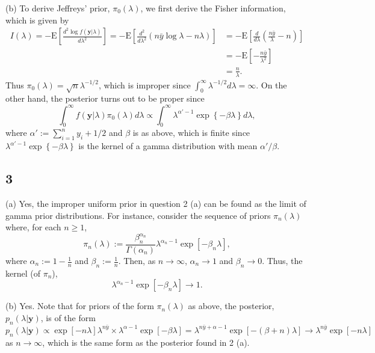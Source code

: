 \documentclass[12pt]{article}
\begin{document}
(b) To derive Jeffreys' prior, $\pi_0(\lambda)$, we first derive the Fisher information, which is given by 
\begin{align*}
  I(\lambda) = -\mathrm{E}\left[ \frac{d^{2}\log f(\bm{y}|\lambda)}{d\lambda^2} \right] = - \mathrm{E}\left[ \frac{d^2}{d\lambda^2}\left( 
  n\bar{y}\log\lambda - n\lambda \right) \right] 
  & = -\mathrm{E}\left[ \frac{d}{d\lambda}\left( \frac{n\bar{y}}{\lambda} - n \right) \right] \\
  & = -\mathrm{E}\left[ -\frac{n\bar{y}}{\lambda^2} \right] \\
  & = \frac{n}{\lambda}.
\end{align*}
Thus $\pi_0(\lambda) = \sqrt{n}\lambda^{-1/2}$, which is improper since $\int_{0}^{\infty}\lambda^{-1/2}d\lambda = \infty$.
On the other hand, the posterior turns out to be proper since 
\[
  \int_{0}^{\infty} f(\bm{y}|\lambda)\pi_0(\lambda)d\lambda \propto \int_{0}^{\infty} \lambda^{\alpha' - 1}\exp\left\{ -\beta \lambda
  \right\}d\lambda,
\]
where $\alpha' := \sum_{i=1}^{n}y_i + 1/2$ and $\beta$ is as above, which is finite since $\lambda^{\alpha' - 1}\exp\left\{ -\beta\lambda \right\}$ is
the kernel of a gamma distribution with mean $\alpha' / \beta$.

\subsection*{3} (a) Yes, the improper uniform prior in question 2 (a) can be found as the limit of gamma prior distributions. For instance, consider
the sequence of priors $\pi_n(\lambda)$ where, for each $n \geq 1$,
\[
  \pi_n(\lambda) := \frac{\beta_n^{\alpha_n}}{\Gamma(\alpha_n)} \lambda^{\alpha_n - 1}\exp\left[ -\beta_n \lambda \right],
\]
where $\alpha_n := 1 - \frac{1}{n}$ and $\beta_n := \frac{1}{n}$. Then, as $n \rightarrow \infty$, $\alpha_n \rightarrow 1$ and $\beta_n \rightarrow
0$. Thus, the kernel (of $\pi_n$),
\[ \lambda^{\alpha_n - 1}\exp\left[ -\beta_n \lambda \right] \rightarrow 1. \]

(b) Yes. Note that for priors of the form $\pi_n(\lambda)$ as above, the posterior, $p_n(\lambda | \bm{y})$, is of the form 
\[
  p_n(\lambda|\bm{y}) \propto \exp\left[ -n\lambda \right]\lambda^{n\bar{y}} \times \lambda^{\alpha -1}\exp\left[ -\beta\lambda \right]
    = \lambda^{n\bar{y} + \alpha - 1}\exp\left[ -(\beta + n)\lambda \right] \longrightarrow \lambda^{n\bar{y}}\exp\left[ -n\lambda \right]
\]
as $n \rightarrow \infty$, which is the same form as the posterior found in 2 (a).
\end{document}
